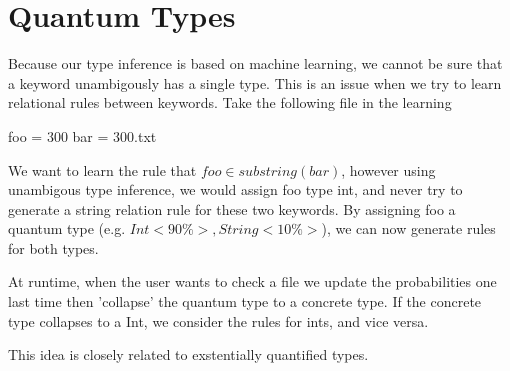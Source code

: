 \section{Quantum Types}

Because our type inference is based on machine learning, we cannot be sure that a keyword unambigously has a single type.
This is an issue when we try to learn relational rules between keywords.
Take the following file in the learning

foo = 300
bar = 300.txt


We want to learn the rule that $foo \in {substring(bar)}$, however using unambigous type inference, we would assign foo type int, and never try to generate a string relation rule for these two keywords.
By assigning foo a quantum type (e.g. ${Int <90\%>, String <10\%>}$), we can now generate rules for both types.

At runtime, when the user wants to check a file we update the probabilities one last time then 'collapse' the quantum type to a concrete type.
If the concrete type collapses to a Int, we consider the rules for ints, and vice versa.

This idea is closely related to exstentially quantified types.

